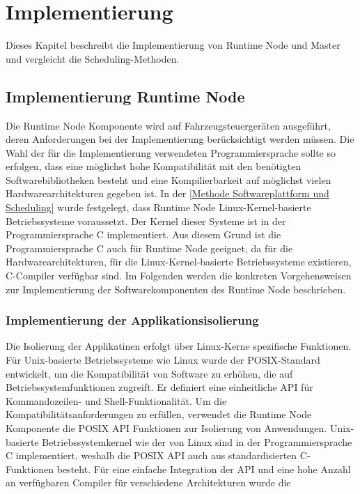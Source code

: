 \chapter{Implementierung}

Dieses Kapitel beschreibt die Implementierung von Runtime Node und Master und vergleicht die Scheduling-Methoden.

\section{Implementierung Runtime Node}

Die Runtime Node Komponente wird auf Fahrzeugsteuergeräten ausgeführt, deren Anforderungen bei der Implementierung berücksichtigt werden müssen. Die Wahl der für die Implementierung verwendeten Programmiersprache sollte so erfolgen, dass eine möglichst hohe Kompatibilität mit den benötigten Softwarebibliotheken besteht und eine Kompilierbarkeit auf möglichst vielen Hardwarearchitekturen gegeben ist. In der \autoref{Methode Softwareplattform und Scheduling} wurde festgelegt, dass Runtime Node Linux-Kernel-basierte Betriebssysteme voraussetzt. Der Kernel dieser Systeme ist in der Programmiersprache C implementiert. Aus diesem Grund ist die Programmiersprache C auch für Runtime Node geeignet, da für die Hardwarearchitekturen, für die Linux-Kernel-basierte Betriebssysteme existieren, C-Compiler verfügbar sind. Im Folgenden werden die konkreten Vorgehensweisen zur Implementierung der Softwarekomponenten des Runtime Node beschrieben.

\subsection{Implementierung der Applikationsisolierung}
 Die Isolierung der Applikatinen erfolgt über Linux-Kerne spezifische Funktionen. Für Unix-basierte Betriebssysteme wie Linux wurde der \gls{POSIX}-Standard entwickelt, um die Kompatibilität von Software zu erhöhen, die auf Betriebssystemfunktionen zugreift. Er definiert eine einheitliche \gls{API} für Kommandozeilen- und Shell-Funktionalität. Um die Kompatibilitätsanforderungen zu erfüllen, verwendet die Runtime Node Komponente die \gls{POSIX} \gls{API} Funktionen zur Isolierung von Anwendungen. Unix-basierte Betriebssystemkernel wie der von Linux sind in der Programmiersprache C implementiert, weshalb die \gls{POSIX} \gls{API} auch aus standardisierten C-Funktionen besteht. Für eine einfache Integration der \gls{API} und eine hohe Anzahl an verfügbaren Compiler für verschiedene Architekturen wurde die 